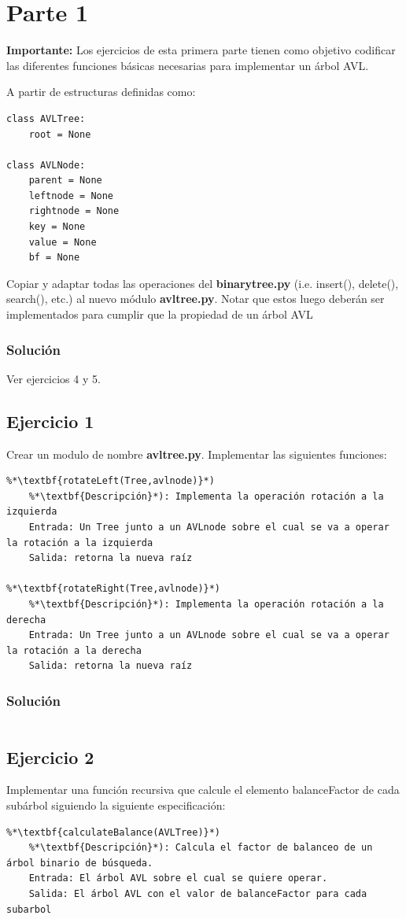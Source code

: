 \documentclass{article}
\begin{document}

\section*{Parte 1}

\textbf{Importante:} Los ejercicios de esta primera parte tienen como objetivo codificar las diferentes funciones básicas necesarias para implementar un árbol AVL.

A partir de estructuras definidas como:

\begin{lstlisting}
class AVLTree:
    root = None

class AVLNode:
    parent = None
    leftnode = None
    rightnode = None
    key = None
    value = None
    bf = None
\end{lstlisting}

Copiar y adaptar todas las operaciones del \textbf{binarytree.py} (i.e. insert(), delete(), search(), etc.) al nuevo módulo \textbf{avltree.py}. Notar que estos luego deberán ser implementados para cumplir que la propiedad de un árbol AVL
\subsubsection*{Solución}
Ver ejercicios 4 y 5.


\subsection*{Ejercicio 1}
Crear un modulo de nombre \textbf{avltree.py}. Implementar las siguientes funciones:
\begin{lstlisting}
%*\textbf{rotateLeft(Tree,avlnode)}*)
    %*\textbf{Descripción}*): Implementa la operación rotación a la izquierda
    Entrada: Un Tree junto a un AVLnode sobre el cual se va a operar la rotación a la izquierda
    Salida: retorna la nueva raíz

%*\textbf{rotateRight(Tree,avlnode)}*)
    %*\textbf{Descripción}*): Implementa la operación rotación a la derecha
    Entrada: Un Tree junto a un AVLnode sobre el cual se va a operar la rotación a la derecha
    Salida: retorna la nueva raíz
\end{lstlisting}
\subsubsection*{Solución}
\inputminted{python3}{./code/snippets/ejercicio1.py}


\subsection*{Ejercicio 2}
Implementar una función recursiva que calcule el elemento balanceFactor de cada subárbol siguiendo la siguiente especificación:
\begin{lstlisting}
%*\textbf{calculateBalance(AVLTree)}*)
    %*\textbf{Descripción}*): Calcula el factor de balanceo de un árbol binario de búsqueda.
    Entrada: El árbol AVL sobre el cual se quiere operar.
    Salida: El árbol AVL con el valor de balanceFactor para cada subarbol
\end{lstlisting}
\end{document}
